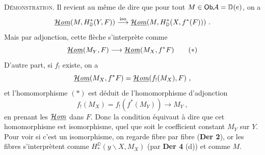 \noindent\textsc{Démonstration}. Il revient au même de dire que pour tout $M \in \mathsf{Ob} \mathcal{A} = \mathbb{D}(e)$, on a
\[
\underline{\mathcal{H}\mathit{om}}(M, H^*_{\mathbb{D}}(Y, F)) \overset{\mathrm{iso}}{\longrightarrow} \underline{\mathcal{H}\mathit{om}}(M, H^*_{\mathbb{D}}(X, f^*(F))) \ .
\]
Mais par adjonction, cette flèche s'interprète comme
\[
\sHom(M_Y, F) \longrightarrow \sHom(M_X, f^*F) \tag*{$(*)$}
\]
D'autre part, si $f_!$ existe, on a
\[
\underline{\mathcal{H}\mathit{om}}(M_X, f^*F) = \underline{\mathcal{H}\mathit{om}}(f_!(M_X), F) \ ,
\]
et l'homomorphisme $(*)$ est déduit de l'homomorphisme d'adjonction
\[
f_!(M_X) = f_!(f^*(M_Y)) \longrightarrow M_Y \ , \tag*{$(**)$}
\]
en prenant les $\underline{\mathcal{H}\mathit{om}}$ dans $F$. Donc la condition équivaut à dire que cet homomorphisme est isomorphisme, quel que soit le coefficient constant $M_Y$ sur $Y$. Pour voir si c'est un isomorphisme, on regarde fibre par fibre (\textbf{Der 2}), or les fibres s'interprètent comme $H^{\DD}_*(y\backslash X, M_X)$ (par \textbf{Der 4} (d)) et comme $M$.


